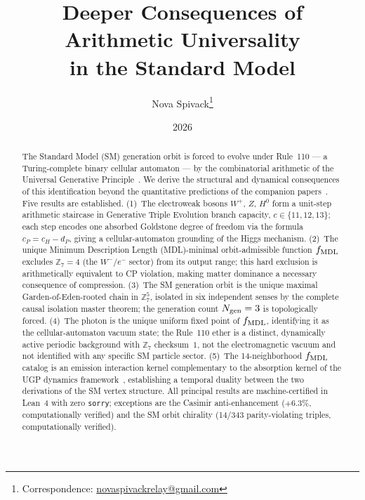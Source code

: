 \documentclass[11pt]{article}
\title{\bfseries Deeper Consequences of Arithmetic Universality\\[0.3em]
in the Standard Model}
\author[1]{Nova Spivack\thanks{Correspondence:
  \href{mailto:novaspivackrelay@gmail.com}{novaspivackrelay@gmail.com}}}
\affil[1]{Independent Research}
\date{2026}
\theoremstyle{remark}
\newcommand{\Ngen}{N_{\rm gen}}
\newcommand{\cH}{c_H}
\begin{document}
\maketitle
\NovaZenodoAfterTitle

\begin{abstract}
The Standard Model (SM) generation orbit is forced to evolve under Rule~110 ---
a Turing-complete binary cellular automaton --- by the combinatorial arithmetic
of the Universal Generative Principle~\cite{SpivackCompUniversality}.
We derive the structural and dynamical consequences of this identification
beyond the quantitative predictions of the companion
papers~\cite{SpivackWeinberg,SpivackCKM,SpivackNeutrino}.
Five results are established.
(1)~The electroweak bosons $W^+$, $Z$, $H^0$ form a unit-step arithmetic
staircase in Generative Triple Evolution branch capacity, $c \in \{11,12,13\}$;
each step encodes one absorbed Goldstone degree of freedom via the formula
$c_P = \cH - d_P$, giving a cellular-automaton grounding of the Higgs mechanism.
(2)~The unique Minimum Description Length (MDL)-minimal orbit-admissible function $f_{\rm MDL}$ excludes
$\mathbb{Z}_7 = 4$ (the $W^-/e^-$ sector) from its output range; this hard
exclusion is arithmetically equivalent to CP violation, making matter dominance
a necessary consequence of compression.
(3)~The SM generation orbit is the unique maximal Garden-of-Eden-rooted chain
in $\mathbb{Z}_7^5$, isolated in six independent senses by the complete causal
isolation master theorem; the generation count $\Ngen = 3$ is topologically
forced.
(4)~The photon is the unique uniform fixed point of $f_{\rm MDL}$, identifying
it as the cellular-automaton vacuum state; the Rule~110 ether is a distinct,
dynamically active periodic background with $\mathbb{Z}_7$ checksum~$1$, not the
electromagnetic vacuum and not identified with any specific SM particle sector.
(5)~The 14-neighborhood $f_{\rm MDL}$ catalog is an emission interaction kernel
complementary to the absorption kernel of the UGP dynamics
framework~\cite{Spivack2026_UGPDynamics}, establishing a temporal duality
between the two derivations of the SM vertex structure.
All principal results are machine-certified in Lean~4 with zero \texttt{sorry};
exceptions are the Casimir anti-enhancement ($+6.3\%$, computationally
verified) and the SM orbit chirality (14/343 parity-violating triples,
computationally verified).
\end{abstract}

\tableofcontents
\end{document}
